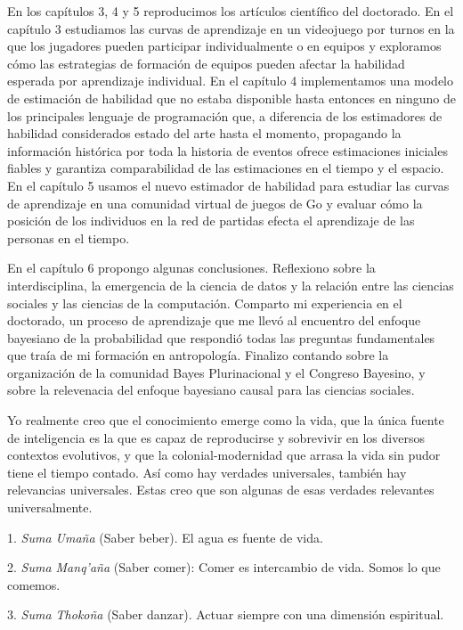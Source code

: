\documentclass[a4paper,11pt]{book}
\theoremstyle{definition}
\begin{document}
En los capítulos 3, 4 y 5 reproducimos los artículos científico del doctorado.
%
En el capítulo 3 estudiamos las curvas de aprendizaje en un videojuego por turnos en la que los jugadores pueden participar individualmente o en equipos y exploramos cómo las estrategias de formación de equipos pueden afectar la habilidad esperada por aprendizaje individual.
%
En el capítulo 4 implementamos una modelo de estimación de habilidad que no estaba disponible hasta entonces en ninguno de los principales lenguaje de programación que, a diferencia de los estimadores de habilidad considerados estado del arte hasta el momento, propagando la información histórica por toda la historia de eventos ofrece estimaciones iniciales fiables y garantiza comparabilidad de las estimaciones en el tiempo y el espacio.
%
En el capítulo 5 usamos el nuevo estimador de habilidad para estudiar las curvas de aprendizaje en una comunidad virtual de juegos de Go y evaluar cómo la posición de los individuos en la red de partidas efecta el aprendizaje de las personas en el tiempo.


En el capítulo 6 propongo algunas conclusiones.
%
Reflexiono sobre la interdisciplina, la emergencia de la ciencia de datos y la relación entre las ciencias sociales y las ciencias de la computación.
%
Comparto mi experiencia en el doctorado, un proceso de aprendizaje que me llevó al encuentro del enfoque bayesiano de la probabilidad que respondió todas las preguntas fundamentales que traía de mi formación en antropología.
%
Finalizo contando sobre la organización de la comunidad Bayes Plurinacional y el Congreso Bayesino, y sobre la relevenacia del enfoque bayesiano causal para las ciencias sociales.


Yo realmente creo que el conocimiento emerge como la vida, que la única fuente de inteligencia es la que es capaz de reproducirse y sobrevivir en los diversos contextos evolutivos, y que la colonial-modernidad que arrasa la vida sin pudor tiene el tiempo contado.
%
Así como hay verdades universales, también hay relevancias universales.
%
Estas creo que son algunas de esas verdades relevantes universalmente.

1. \emph{Suma Umaña} (Saber beber). El agua es fuente de vida.

2. \emph{Suma Manq'aña} (Saber comer): Comer es intercambio de vida. Somos lo que comemos.

3. \emph{Suma Thokoña} (Saber danzar). Actuar siempre con una dimensión espiritual.
\end{document}
